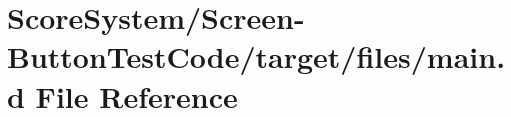 \hypertarget{_screen-_button_test_code_2target_2files_2main_8d}{}\section{Score\+System/\+Screen-\/\+Button\+Test\+Code/target/files/main.d File Reference}
\label{_screen-_button_test_code_2target_2files_2main_8d}
